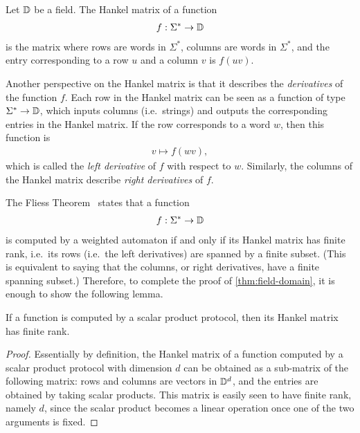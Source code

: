 \begin{definition}\label{def:hankel-matrix}
    Let $\mathbb D$ be a field. The Hankel matrix of a function 
    \begin{align*}
    f : \Sigma^* \to \mathbb D
    \end{align*}  
    is the matrix where rows are words in $\Sigma^*$, columns are words in $\Sigma^*$, and the entry corresponding to a row $u$ and a column $v$ is $f(uv)$.
\end{definition}

Another perspective on the Hankel matrix is that it describes the \emph{derivatives} of the function $f$. Each row in the Hankel matrix can be seen as a function of type $\Sigma^* \to \mathbb D$, which inputs columns (i.e.~strings) and outputs the corresponding entries in the Hankel matrix. If the row corresponds to a word $w$, then this function is
\begin{align*}
v \mapsto f(wv),
\end{align*}
which is called the \emph{left derivative} of $f$ with respect to $w$. Similarly, the columns of the Hankel matrix describe \emph{right derivatives} of $f$.

The Fliess Theorem~\cite[Theorem 2.1.1]{fliess1974} states that a function 
\begin{align*}
f : \Sigma^* \to \mathbb D
\end{align*}
is computed by a weighted automaton if and only if  its  Hankel matrix  has finite rank, i.e.~its rows (i.e.~the left derivatives) are spanned by a finite subset. (This is equivalent to saying that the columns, or right derivatives, have a finite spanning subset.) Therefore, to complete the proof of \cref{thm:field-domain}, it is enough to show the following lemma.

\begin{lemma}\label{lem:hankel-finite-rank}
    If a function is computed by a scalar product protocol, then its Hankel matrix has finite rank.
\end{lemma}
\begin{proof}
    Essentially by definition, the Hankel matrix of a function computed by a scalar product protocol with dimension $d$ can be obtained as a sub-matrix of the following matrix: rows and columns are vectors in $\mathbb D^d$, and the entries are obtained by taking scalar products. This matrix is easily seen to have finite rank, namely $d$, since the scalar product  becomes a linear operation once one of the two arguments is fixed.
\end{proof}
